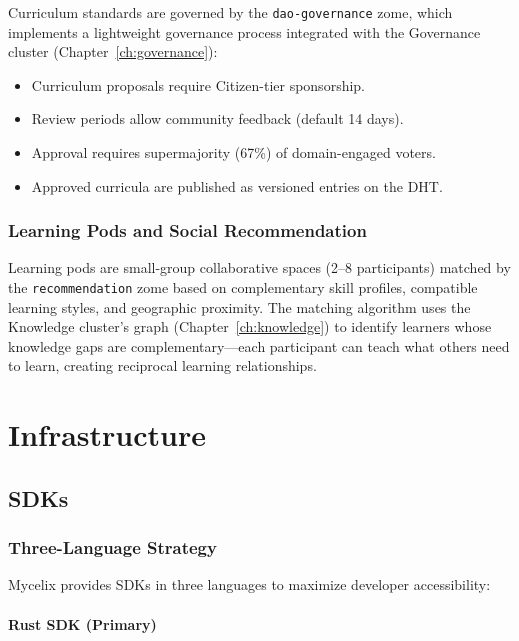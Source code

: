 \documentclass[12pt]{book}
\begin{document}
Curriculum standards are governed by the \texttt{dao-governance} zome,
which implements a lightweight governance process integrated with the
Governance cluster (Chapter~\ref{ch:governance}):

\begin{itemize}
  \item Curriculum proposals require Citizen-tier sponsorship.
  \item Review periods allow community feedback (default 14 days).
  \item Approval requires supermajority (67\%) of domain-engaged voters.
  \item Approved curricula are published as versioned entries on the DHT.
\end{itemize}

\section{Learning Pods and Social Recommendation}

Learning pods are small-group collaborative spaces (2--8 participants)
matched by the \texttt{recommendation} zome based on complementary
skill profiles, compatible learning styles, and geographic proximity.
The matching algorithm uses the Knowledge cluster's graph
(Chapter~\ref{ch:knowledge}) to identify learners whose knowledge
gaps are complementary---each participant can teach what others need
to learn, creating reciprocal learning relationships.



\part{Infrastructure}

\chapter{SDKs}

\section{Three-Language Strategy}

Mycelix provides SDKs in three languages to maximize developer accessibility:

\subsection{Rust SDK (Primary)}
\end{document}
